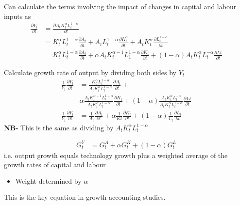 \documentclass{beamer}
\begin{document}
\begin{frame}
 Can calculate the terms involving the impact of changes in capital and labour inputs as
  \begin{align}
    \frac{\partial Y_t}{\partial t} &= \frac{\partial A_tK_t^{\alpha}L_t^{1-\alpha}}{\partial t}\\ \nonumber
    &= K_t^{\alpha}L_t^{1-\alpha}\frac{\partial A_t}{\partial t} + A_tL_t^{1-\alpha}\frac{\partial K_t^{\alpha}}{\partial t} + A_tK_t^{\alpha}\frac{\partial L_t^{1-\alpha}}{\partial t}\\ \nonumber
    &= K_t^{\alpha}L_t^{1-\alpha}\frac{\partial A_t}{\partial t} + \alpha A_tK_t^{\alpha-1}L_1^{1-\alpha} \frac{\partial K_t}{\partial t}  + (1-\alpha)A_tK_t^{\alpha}L_t^{-\alpha}\frac{\partial Lt}{\partial t}
  \end{align}
\end{frame}

\begin{frame}
 Calculate growth rate of output by dividing both sides by $Y_t$   
  \begin{align}
    \frac{1}{Y_t}\frac{\partial Y_t}{\partial t} & = \frac{K_t^{\alpha}L_t^{1-\alpha}}{A_tK_t^{\alpha}L_t^{1-\alpha}} \frac{\partial A_t}{\partial t} + \\ \nonumber & \alpha \frac{A_tK_t^{\alpha-1}L_1^{1-\alpha}}{A_tK_t^{\alpha}L_t^{1-\alpha}} \frac{\partial K_t}{\partial t} + (1-\alpha) \frac{A_tK_t^{\alpha}L_t^{-\alpha}}{A_tK_t^{\alpha}L_t^{1-\alpha}} \frac{\partial Lt}{\partial t}\\ \nonumber
    \frac{1}{Y_t}\frac{\partial Y_t}{\partial t} & = \frac{1}{A_t}\frac{\partial A_t}{\partial t} + \alpha \frac{1}{Kt}\frac{\partial K_t}{\partial t} + (1-\alpha) \frac{1}{L_t}\frac{\partial L_t}{\partial t}    
\end{align}
  \medskip
  \textbf{NB-} This is the same as dividing by $A_tK_t^{\alpha}L_t^{1-\alpha}$
\end{frame}


\begin{frame}
  \begin{align}
    G_t ^Y &=G_t^A +\alpha G_t^K + (1-\alpha)G_t^L
  \end{align}
  i.e. output growth equals technology growth plus a weighted average of the growth rates of capital and labour
  \begin{itemize}
    \item Weight determined by $\alpha$
  \end{itemize}
  \medskip
  This is the key equation in growth accounting studies. 
\end{frame}
\end{document}
